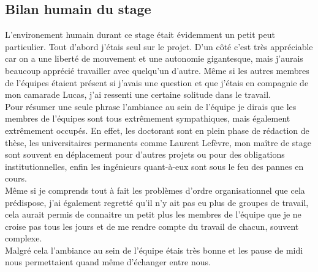 \subsection{Bilan humain du stage}
L'environement humain durant ce stage était évidemment un petit peut particulier. Tout d'abord j'étais seul sur le projet. D'un côté c'est très appréciable car on a une liberté de mouvement et une autonomie gigantesque, mais j'aurais beaucoup apprécié travailler avec quelqu'un d'autre. Même si les autres membres de l'équipes étaient présent si j'avais une question et que j'étais en compagnie de mon camarade Lucas, j'ai ressenti une certaine solitude dans le travail.\\

Pour résumer une seule phrase l'ambiance au sein de l'équipe je dirais que les membres de l'équipes sont tous extrêmement sympathiques, mais également extrêmement occupés. En effet, les doctorant sont en plein phase de rédaction de thèse, les universitaires permanents comme Laurent Lefèvre, mon maître de stage sont souvent en déplacement pour d'autres projets ou pour des obligations institutionnelles, enfin les ingénieurs quant-à-eux sont sous le feu des pannes en cours.\\

Même si je comprends tout à fait les problèmes d'ordre organisationnel que cela prédispose, j'ai également regretté qu'il n'y ait pas eu plus de groupes de travail, cela aurait permis de connaitre un petit plus les membres de l'équipe que je ne croise pas tous les jours et de me rendre compte du travail de chacun, souvent complexe.\\

Malgré cela l'ambiance au sein de l'équipe étais très bonne et les pause de midi nous permettaient quand même d'échanger entre nous.